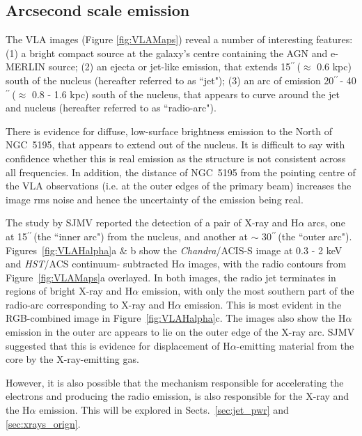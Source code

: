 \documentclass[fleqn,usenatbib]{mnras}
\def\fig{Figure}
\def\Fig{Figure}
\def\Figs{Figures}
\def\sects{Sects.}
\def\arcs{$^{\prime\prime}\,$}
\begin{document}
\subsection{Arcsecond scale emission }

The VLA images (Figure \ref{fig:VLAMaps}) reveal a number of interesting features: (1) a bright compact source at the galaxy's centre containing the AGN and e-MERLIN source; (2) an ejecta or jet-like emission, that extends 15\arcs ($\approx$ 0.6 kpc) south of the nucleus (hereafter referred to as ``jet"); (3) an arc of emission 20\arcs - 40\arcs ($\approx$ 0.8 - 1.6 kpc) south of the nucleus, that appears to curve around the jet and nucleus (hereafter referred to as ``radio-arc"). 


There is evidence for diffuse, low-surface brightness emission to the North of NGC~5195, that appears 
to extend out of the nucleus. It is difficult to say with confidence whether this is real emission as 
the structure is not consistent across all frequencies. In addition, the distance of NGC~5195 from the pointing centre of the VLA observations (i.e. at the outer edges of the primary beam) increases the image rms noise and hence the uncertainty of the emission being real.

The study by SJMV reported the detection of a pair of X-ray and H$\alpha$ arcs, one at 15\arcs (the ``inner arc") from the nucleus, and  another at $\sim$ 30\arcs (the ``outer arc"). \Figs~\ref{fig:VLAHalpha}a $\&$ b show the \textit{Chandra}/ACIS-S image at 0.3 - 2 keV and \textit{HST}/ACS continuum-
subtracted H$\alpha$ images, with the radio contours from \fig~\ref{fig:VLAMaps}a overlayed.
In both images, the radio jet terminates in regions of bright X-ray and H$\alpha$ emission, with only the 
most southern part of the radio-arc corresponding to X-ray and H$\alpha$ emission. This is most evident in 
the RGB-combined image in \Fig~\ref{fig:VLAHalpha}c. {The images also show the H$\alpha$ emission in the outer arc appears to lie on the outer edge of the X-ray arc. SJMV suggested that this is evidence for displacement of H$\alpha$-emitting material from the core by the X-ray-emitting gas}. 

{However, it is also possible that the mechanism responsible for accelerating the electrons and producing the 
radio emission, is also responsible for the X-ray and the H$\alpha$ emission. This will be explored in \sects~\ref{sec:jet_pwr} and \ref{sec:xrays_orign}.}
\end{document}
